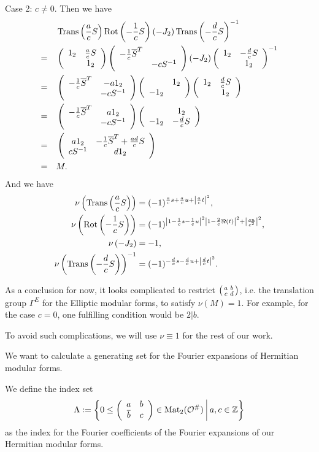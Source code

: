 \begin{remark}
Case 2: $c\neq 0$. Then we have
\begin{align*}
& \operatorname{Trans}\left(\frac{a}{c}S\right) \operatorname{Rot}\left(-\frac{1}{c}S\right) (-J_2) \operatorname{Trans}\left(-\frac{d}{c}S\right)^{-1} \\
=\quad & \left( \begin{array}{cc} 1_2 & \frac{a}{c}S \\  & 1_2 \end{array} \right)
\left( \begin{array}{cc} -\frac{1}{c}\overline{S}^T &  \\  & -cS^{-1} \end{array} \right)
(-J_2)
\left( \begin{array}{cc} 1_2 & -\frac{d}{c}S \\  & 1_2 \end{array} \right)^{-1} \\
=\quad &
\left( \begin{array}{cc} -\frac{1}{c}\overline{S}^T & -a 1_2 \\  & -cS^{-1} \end{array} \right)
\left( \begin{array}{cc}  & 1_2 \\ -1_2 &  \end{array} \right)
\left( \begin{array}{cc} 1_2 & \frac{d}{c}S \\  & 1_2 \end{array} \right) \\
=\quad &
\left( \begin{array}{cc} -\frac{1}{c}\overline{S}^T & a 1_2 \\  & -cS^{-1} \end{array} \right)
\left( \begin{array}{cc}  & 1_2 \\ -1_2 & -\frac{d}{c}S \end{array} \right) \\
=\quad &
\left( \begin{array}{cc} a 1_2 & -\frac{1}{c}\overline{S}^T + \frac{ad}{c}S \\ cS^{-1} & d 1_2 \end{array} \right) \\
=\quad &
M.
\end{align*}
And we have
\begin{align*}
\nu\left( \operatorname{Trans}\left(\frac{a}{c}S \right) \right) & = (-1)^{\frac{a}{c}s + \frac{a}{c}u + \left|\frac{a}{c} t \right|^2} , \\
\nu\left( \operatorname{Rot}\left(-\frac{1}{c}S \right) \right) & = (-1)^{\left|1-\frac{1}{c}s -\frac{1}{c}u\right|^2 \left|1 - \frac{2}{c}\Re(t) \right|^2 + \left| \frac{su}{c^2} \right|^2 } , \\
\nu\left( -J_2 \right) & = -1 , \\
\nu\left( \operatorname{Trans}\left(-\frac{d}{c}S \right) \right)^{-1} & = (-1)^{-\frac{d}{c}s - \frac{d}{c}u + \left|\frac{d}{c} t \right|^2} . \\
\end{align*}

As a conclusion for now, it looks complicated to restrict $\left( \begin{smallmatrix} a & b \\ c & d \end{smallmatrix} \right)$, i.e. the translation group $\Gamma^E$ for the Elliptic modular forms, to satisfy $\nu(M)=1$. For example, for the case $c=0$, one fulfilling condition would be $2 | b$.

To avoid such complications, we will use $\nu \equiv 1$ for the rest of our work.\endproof
\end{remark}


\begin{prelim}
We want to calculate a generating set for the Fourier expansions of Hermitian modular forms.

We define the index set
\[ \Lambda := \Set{0 \le \SimpleMatrix{a}{b}{\overline b}{c} \in \M_2(\curlO^\#)}{a,c \in \Z } \]
as the index for the Fourier coefficients of the Fourier expansions of our Hermitian modular forms.
\end{prelim}

